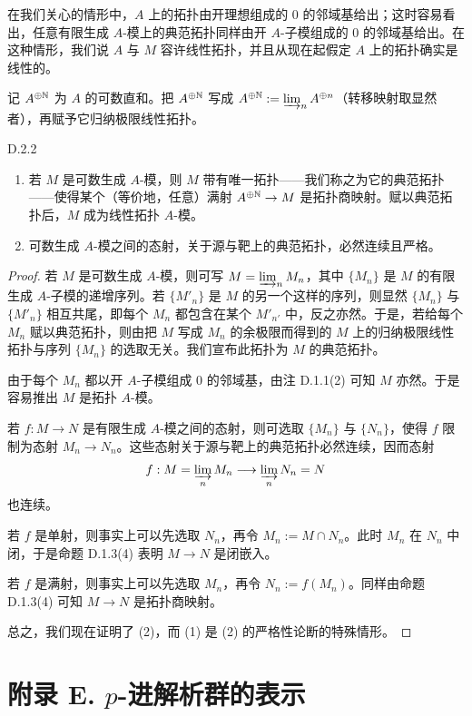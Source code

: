 在我们关心的情形中，$A$ 上的拓扑由开理想组成的 $0$ 的邻域基给出；这时容易看出，任意有限生成 $A$-模上的典范拓扑同样由开 $A$-子模组成的 $0$ 的邻域基给出。在这种情形，我们说 $A$ 与
$M$ 容许线性拓扑，并且从现在起假定 $A$ 上的拓扑确实是线性的。

记 $A^{\oplus\mathbb{N}}$ 为 $A$ 的可数直和。把 $A^{\oplus\mathbb{N}}$ 写成 $A^{\oplus\mathbb{N}}:=\varinjlim_n A^{\oplus n}$（转移映射取显然者），再赋予它归纳极限线性拓扑。

\begin{prop}{D.2.2}\label{thm:a4-20-2}
\begin{enumerate}[label=(\arabic*)]
\item 若 $M$ 是可数生成 $A$-模，则 $M$ 带有唯一拓扑——我们称之为它的典范拓扑——使得某个（等价地，任意）满射 $A^{\oplus\mathbb{N}}\to M$ 是拓扑商映射。赋以典范拓扑后，$M$ 成为线性拓扑 $A$-模。
\item 可数生成 $A$-模之间的态射，关于源与靶上的典范拓扑，必然连续且严格。
\end{enumerate}
\end{prop}

\begin{proof}
若 $M$ 是可数生成 $A$-模，则可写 $M=\varinjlim_n M_n$，其中 $\{M_n\}$ 是 $M$ 的有限生成 $A$-子模的递增序列。若 $\{M'_n\}$ 是 $M$ 的另一个这样的序列，则显然 $\{M_n\}$ 与 $\{M'_n\}$ 相互共尾，即每个 $M_n$ 都包含在某个 $M'_{n'}$ 中，反之亦然。于是，若给每个 $M_n$ 赋以典范拓扑，则由把 $M$ 写成 $M_n$ 的余极限而得到的 $M$ 上的归纳极限线性拓扑与序列 $\{M_n\}$ 的选取无关。我们宣布此拓扑为 $M$ 的典范拓扑。

由于每个 $M_n$ 都以开 $A$-子模组成 $0$ 的邻域基，由注 D.1.1(2) 可知 $M$ 亦然。于是容易推出 $M$ 是拓扑 $A$-模。

若 $f:M\to N$ 是有限生成 $A$-模之间的态射，则可选取 $\{M_n\}$ 与 $\{N_n\}$，使得 $f$ 限制为态射 $M_n\to N_n$。这些态射关于源与靶上的典范拓扑必然连续，因而态射
\[
f:M=\varinjlim_n M_n\longrightarrow\varinjlim_n N_n=N
\]
也连续。

若 $f$ 是单射，则事实上可以先选取 $N_n$，再令 $M_n:=M\cap N_n$。此时 $M_n$ 在 $N_n$ 中闭，于是命题 D.1.3(4) 表明 $M\to N$ 是闭嵌入。

若 $f$ 是满射，则事实上可以先选取 $M_n$，再令 $N_n:=f(M_n)$。同样由命题 D.1.3(4) 可知 $M\to N$ 是拓扑商映射。

总之，我们现在证明了 (2)，而 (1) 是 (2) 的严格性论断的特殊情形。
\end{proof}

\section*{附录 E. $p$-进解析群的表示}

